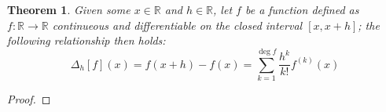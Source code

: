 \newtheorem{theorem}{Theorem}[section]
\begin{theorem}
  \label{thm:series-definition}
  Given some $x\in\mathbb{R}$ and $h\in\mathbb{R}$, let $f$ be a function defined as $f:\mathbb{R}\to\mathbb{R}$ continueous and differentiable on the closed interval $\left[x, x+h\right]$; the following relationship then holds:
  \begin{equation}
    \label{eq:series-definition}
    \Delta_{h}\left[f\right]\left(x\right)=f\left(x+h\right)-f\left(x\right)=\sum^{\deg{f}}_{k=1}\frac{h^k}{k!}f^{\left(k\right)}\left(x\right)
  \end{equation}
\end{theorem}
\begin{proof}
\end{proof}